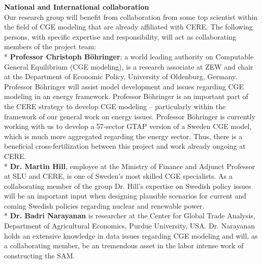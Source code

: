 \textbf{National and International collaboration}\\
Our research group will benefit from collaboration from some top scientist within the field of CGE modeling that are already affiliated with CERE. The following persons, with specific expertise and responsibility, will act as collaborating members of the project team:\\*
\textbf{Professor Christoph Böhringer}; a world leading authority on Computable General Equilibrium (CGE modeling), is a research associate at ZEW and chair at the Department of Economic Policy, University of Oldenburg, Germany. Professor Böhringer will assist model development and issues regarding CGE modeling in an energy framework. Professor Böhringer is an important part of the CERE strategy to develop CGE modeling – particularly within the framework of our general work on energy issues. Professor Böhringer is currently working with us to develop a 57-sector GTAP version of a Sweden CGE model, which is much more aggregated regarding the energy sector. Thus, there is a beneficial cross-fertilization between this project and work already ongoing at CERE.\\*
\textbf{Dr. Martin Hill}, employee at the Ministry of Finance and Adjunct Professor at SLU and CERE, is one of Sweden's most skilled CGE specialists. As a collaborating member of the group Dr. Hill’s expertise on Swedish policy issues will be an important input when designing plausible scenarios for current and coming Swedish policies regarding nuclear and renewable power.\\*
\textbf{Dr. Badri Narayanan} is researcher at the Center for Global Trade Analysis, Department of Agricultural Economics, Purdue University, USA. Dr. Narayanan holds an extensive knowledge in data issues regarding CGE modeling and will, as a collaborating member, be an tremendous asset in the labor intense work of constructing the SAM.
